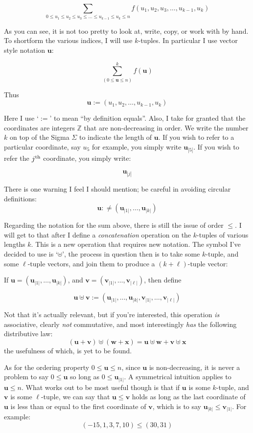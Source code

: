 \documentclass[twoside]{amsart}
\newcommand{\bu}[1][u]{\ensuremath{\mathbf #1}}
\begin{document}
$$ \sum_{0\le u_1\le u_2\le u_3\le\ldots\le u_{k-1}\le u_k\le n}f(u_1, u_2, u_3,\ldots, u_{k-1}, u_k) $$

As you can see, it is not too pretty to look at, write, copy, or work with by hand.  To shortform the various indices,
I will use $ k $-tuples.  In particular I use vector style notation $ \bu $:

$$ \sum_{(0\le\bu\le n)}^k\!\!\!\!\! f(\bu)  $$

Thus
$$ \bu:=(u_1, u_2,\ldots, u_{k-1}, u_k)  $$

Here I use `$ := $' to mean ``by definition equals''.
Also, I take for granted that the coordinates are integers $ \mathbb{Z} $ that are non-decreasing in order.
We write the number $ k $ on top of the Sigma $ \Sigma $ to indicate the length of $ \bu $.
If you wish to refer to a particular coordinate, say $ u_5 $ for example, you simply write
$ \bu_{|5|} $.  If you wish to refer the $ j^{\mbox{\scriptsize{th}}} $ coordinate, you simply write:

$$  \bu_{|j|}  $$

There is one warning I feel I should mention; be careful in avoiding circular definitions:
$$  \bu:\ne(\bu_{|1|},\ldots,\bu_{|k|})  $$

Regarding the notation for the sum above, there is still the issue of order $ \le $.  I will get to that after
I define a \emph{concatenation} operation on the $ k $-tuples of various lengths $ k $.  This is a new operation
that requires new notation.  The symbol I've decided to use is `$  \uplus  $', the process in question then is
to take some $  k  $-tuple, and some $  \ell  $-tuple vectors, and join them to produce a $  (k+\ell)  $-tuple vector:

If $  \bu =(\bu_{|1|},\ldots ,\bu_{|k|})  $, and $  \bu[v] =(\bu[v]_{|1|},\ldots ,\bu[v]_{|\ell|})  $,
then define 

$$  \bu\uplus\bu[v]:=(\bu_{|1|},\ldots ,\bu_{|k|},\bu[v]_{|1|}, \ldots ,\bu[v]_{|\ell|})  $$

Not that it's actually relevant, but if you're interested, this operation \emph{is} associative,
clearly \emph{not} commutative, and most interestingly \emph{has} the following distributive law:
$$  (\bu+\bu[v])\uplus(\bu[w]+\bu[x])=\bu\uplus\bu[w]+\bu[v]\uplus\bu[x]  $$
the usefulness of which, is yet to be found.

As for the ordering property $ 0\le\bu\le n $, since $ \bu $ is non-decreasing, it is never a problem to say $ 0\le\bu $
so long as $ 0\le\bu_{|1|} $.  A symmetrical intuition applies to $ \bu\le n $.  What works out to be most
useful though is that if $ \bu $ is some $ k $-tuple, and $ \bu[v] $ is some $ \ell $-tuple, we can say
that $ \bu\le\bu[v] $ holds as long as the last coordinate of $ \bu $ is less than or equal to the first coordinate
of $ \bu[v] $, which is to say $ \bu_{|k|}\le\bu[v]_{|1|} $.  For example:
$$  (-15,1,3,7,10)\le (30,31)  $$  
\end{document}
